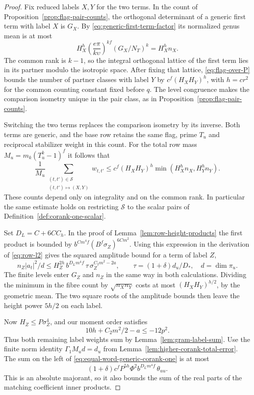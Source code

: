 \begin{proof}
Fix reduced labels \(X,Y\) for the two terms. In the count of
Proposition~\ref{prop:flag-pair-counts}, the orthogonal determinant
of a generic first term with label \(X\) is \(G_X\). By
\eqref{eq:generic-first-term-factor} its normalized genus mean is at most
\[
 H_X^h\left(\frac{e\pi}{k\upsilon}\right)^{kf}
          (G_X/N_T)^k=H_X^h n_X .
\]
The common rank is \(k-1\), so the integral orthogonal lattice of
the first term lies in its partner modulo the isotropic space.
After fixing that lattice, \eqref{eq:flag-over-P} bounds the number
of partner classes with label \(Y\) by \(c^f(H_XH_Y)^h\), with
\(h=cr^2\) for the common counting constant fixed before \(q\).
The level congruence makes the comparison isometry unique in the
pair class, as in Proposition~\ref{prop:flag-pair-counts}.

Switching the two terms replaces the comparison isometry by its
inverse. Both terms are generic, and the base row retains the same
flag, prime \(T_u\) and reciprocal stabilizer weight in this
count. For the total row mass \(M_u=m_k(T_u^k-1)^f\) it follows that
\[
 \frac1{M_u}\sum_{\substack{(t,t')\in\mathcal S\\(t,t')\mapsto(X,Y)}}w_{t,t'}
 \le c^f(H_XH_Y)^h\min(H_X^h n_X,H_Y^h n_Y).
\]
These counts depend only on integrality and on the common rank. In
particular the same estimate holds on restricting \(\mathcal S\)
to the scalar pairs of Definition~\ref{def:corank-one-scalar}.

Set \(D_L=C+6CC_h\). In the proof of Lemma~\ref{lem:row-height-products}
the first product is bounded by
\(b^{Cm^4f}(B^f\sigma_Z)^{6Cm^2}\).
Using this expression in the derivation of \eqref{eq:row-l2}
gives the squared amplitude bound for a term of label \(Z\),
\[
 n_Z|a_t|^2/d
 \le H_Z^{2h}\,b^{D_Lm^4f}\,\tau\,
                   \sigma_Z^{C_2m^2-2a},\qquad
 \tau=(1+\delta)d_u/D_*,\quad d=\dim\pi_u .
\]
The finite levels enter \(G_Z\) and \(n_Z\) in the same way in
both calculations. Dividing the minimum in the fibre count by
\(\sqrt{n_Xn_Y}\) costs at most \((H_XH_Y)^{h/2}\), by the
geometric mean. The two square roots of the amplitude bounds then
leave the height power \(5h/2\) on each label.

Now \(H_Z\le P\sigma_Z^4\), and our moment order satisfies
\[
 10h+C_2m^2/2-a\le-12p^2 .
\]
Thus both remaining label weights sum by Lemma~\ref{lem:gram-label-sum}.
Use the finite norm identity \(\Gamma_1 M_u d=d_u\) from
Lemma~\ref{lem:higher-corank-total-error}. The sum on the left of
\eqref{eq:equal-word-generic-corank-one} is at most
\[
       (1+\delta)c^f P^{5h}\Phi^2 b^{D_Lm^4f}\,\theta_{uu}.
\]
This is an absolute majorant, so it also bounds the sum of the real
parts of the matching coefficient inner products.


\end{proof}

